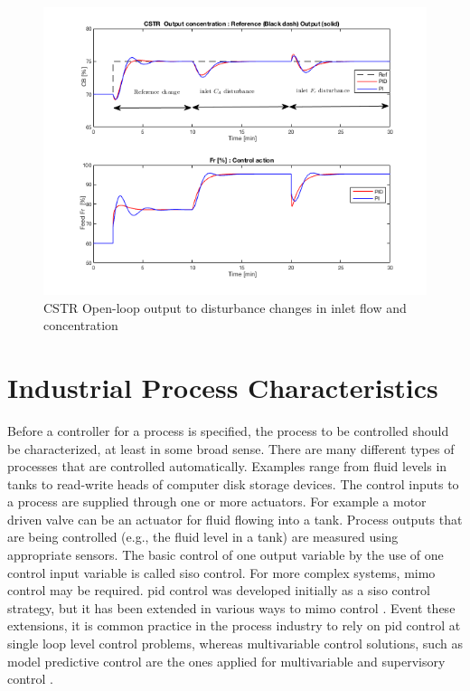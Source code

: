 \begin{figure}[tb]
\centering
\includegraphics[width=\linewidth]{../figuras/Ch2FigureClosedLoop}
\caption{CSTR Open-loop output to disturbance changes in inlet flow and concentration} 
\label{Ch2fig:CSTRFigureClosedLoop}
\end{figure}


\section{Industrial Process Characteristics}
\label{sec:2}

Before a controller for a process is specified, the process to be controlled should be characterized, at least in some broad sense. There are many different types of processes that are controlled automatically. Examples range from fluid levels in tanks to read-write heads of computer disk storage devices. The control inputs to a process are supplied through one or more actuators. For example a motor driven valve can be an actuator for fluid flowing into a tank. Process outputs that are being controlled (e.g., the fluid level in a tank) are measured using appropriate sensors. The basic control of one output variable by the use of one control input variable is called \gls{siso} control. For more complex systems, \gls{mimo} control may be required. \gls{pid} control was developed initially as a \gls{siso} control strategy, but it has been extended in various ways to \gls{mimo} control \citep{wang2008}. Event these extensions, it is common practice in the process industry to rely on \gls{pid} control at single loop level control problems, whereas multivariable control solutions, such as model predictive control are the ones applied for multivariable and supervisory control \citep{VilanovaBook2012}.

